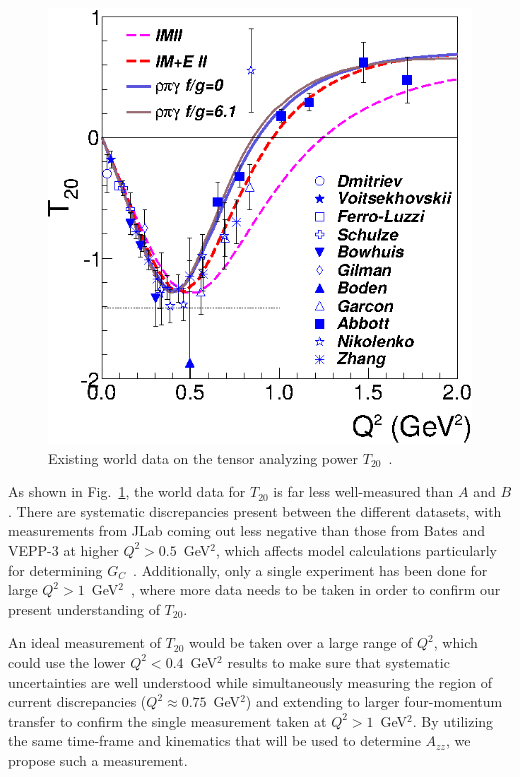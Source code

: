 \begin{figure}
\begin{center}
\includegraphics{figs/t20_data.eps} 
\caption{\label{t20-world}Existing world data on the tensor analyzing power $T_{20}$~\cite{Holt:2012gg}.}
\end{center}
\end{figure}

As shown in Fig.~\ref{t20-world}, the world data for $T_{20}$ is far less well-measured than $A$ and $B$. There are systematic discrepancies present between the different datasets, with measurements from JLab coming out less negative than those from Bates and VEPP-3 at higher $Q^2>0.5$~GeV$^2$, which affects model calculations particularly for determining $G_C$~\cite{Gilman:2001yh}.  Additionally, only a single experiment has been done for large $Q^2>1$~GeV$^2$~\cite{Abbott:2000fg}, where more data needs to be taken in order to confirm our present understanding of $T_{20}$.

An ideal measurement of $T_{20}$ would be taken over a large range of $Q^2$, which could use the lower $Q^2<0.4$~GeV$^2$ results to make sure that systematic uncertainties are well understood while simultaneously measuring the region of current discrepancies ($Q^2\approx0.75$~GeV$^2$) and extending to larger four-momentum transfer to confirm the single measurement taken at $Q^2>1$~GeV$^2$. By utilizing the same time-frame and kinematics that will be used to determine $A_{zz}$, we propose such a measurement.